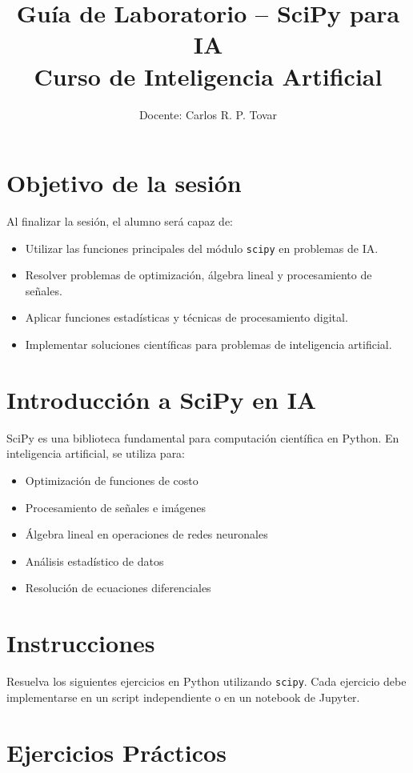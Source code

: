 \documentclass[12pt,a4paper]{article}
\title{\textbf{Guía de Laboratorio – SciPy para IA} \\ Curso de Inteligencia Artificial}
\author{Docente: Carlos R. P. Tovar}
\date{}
\begin{document}
\maketitle

\section*{Objetivo de la sesión}
Al finalizar la sesión, el alumno será capaz de:
\begin{itemize}
    \item Utilizar las funciones principales del módulo \texttt{scipy} en problemas de IA.
    \item Resolver problemas de optimización, álgebra lineal y procesamiento de señales.
    \item Aplicar funciones estadísticas y técnicas de procesamiento digital.
    \item Implementar soluciones científicas para problemas de inteligencia artificial.
\end{itemize}

\section*{Introducción a SciPy en IA}
SciPy es una biblioteca fundamental para computación científica en Python. En inteligencia artificial, se utiliza para:
\begin{itemize}
    \item Optimización de funciones de costo
    \item Procesamiento de señales e imágenes
    \item Álgebra lineal en operaciones de redes neuronales
    \item Análisis estadístico de datos
    \item Resolución de ecuaciones diferenciales
\end{itemize}

\section*{Instrucciones}
Resuelva los siguientes ejercicios en Python utilizando \texttt{scipy}. Cada ejercicio debe implementarse en un script independiente o en un notebook de Jupyter.

\section*{Ejercicios Prácticos}
\end{document}

